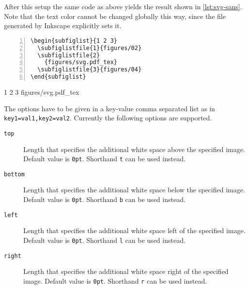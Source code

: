 \documentclass[version=3.12,american]{scrartcl}
\begin{document}
After this setup the same code as above yields the result shown in \cref{lst:svg-sans}. Note that the text color cannot be changed globally this way, since the file generated by Inkscape explicitly sets it.

\begin{listing}
\begin{minipage}{0.4\textwidth}
\begin{Verbatim}[numbers=left]
\begin{subfiglist}{1 2 3}
  \subfiglistfile{1}{figures/02}
  \subfiglistfile{2}
    {figures/svg.pdf_tex}
  \subfiglistfile{3}{figures/04}
\end{subfiglist}
\end{Verbatim}
\end{minipage}
\hfill
\begin{minipage}{0.5\textwidth}
\begin{subfiglist}{1 2 3}
    {figures/svg.pdf_tex}
\end{subfiglist}
\end{minipage}
\caption{Footnotesize sans serif font in SVG image}
\label{lst:svg-sans}
\end{listing}

The options have to be given in a key-value comma separated list as in \texttt{key1=val1,key2=val2}. Currently the following options are supported.

\begin{description}
\item[\texttt{top}\enskip] Length that specifies the additional white space above the specified image. Default value is \texttt{0pt}. Shorthand \texttt{t} can be used instead.

\item[\texttt{bottom}\enskip] Length that specifies the additional white space below the specified image. Default value is \texttt{0pt}. Shorthand \texttt{b} can be used instead.

\item[\texttt{left}\enskip] Length that specifies the additional white space left of the specified image. Default value is \texttt{0pt}. Shorthand \texttt{l} can be used instead.

\item[\texttt{right}\enskip] Length that specifies the additional white space right of the specified image. Default value is \texttt{0pt}. Shorthand \texttt{r} can be used instead.
\end{description}
\end{document}
